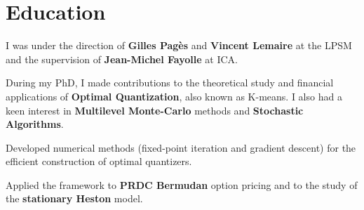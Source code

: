 \documentclass[]{deedy-resume-openfont}
\begin{document}
\lastupdated

\vspace{\topsep}




\section{Education}
\sectionsep

I was under the direction of \textbf{Gilles Pagès} and \textbf{Vincent Lemaire} at the LPSM and the supervision of \textbf{Jean-Michel Fayolle} at ICA.

\vspace{0.2cm}
During my PhD, I made contributions to the theoretical study and financial applications of \textbf{Optimal Quantization}, also known as K-means. I also had a keen interest in \textbf{Multilevel Monte-Carlo} methods and \textbf{Stochastic Algorithms}.
\vspace{0.1cm}
\begin{tightemize}
	\item[\diamond] Developed numerical methods (fixed-point iteration and gradient descent) for the efficient construction of optimal quantizers.
	\item[\diamond] Applied the framework to \textbf{PRDC Bermudan} option pricing and to the study of the \textbf{stationary Heston} model.
\end{tightemize}

\sectionsep

\end{document}
